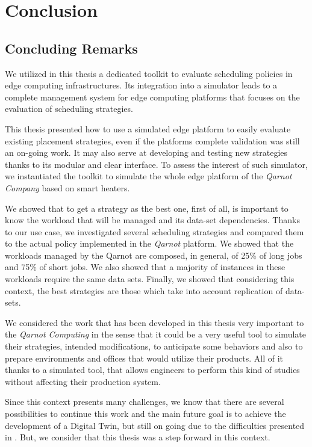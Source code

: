 \chapter{Conclusion}
\label{sec:conclusion}

\section{Concluding Remarks}

We utilized in this thesis a dedicated toolkit to evaluate scheduling policies in edge computing infrastructures. 
Its integration into a simulator leads to a complete management system for edge computing platforms that focuses on the evaluation of scheduling strategies.

This thesis presented how to use a simulated edge platform to easily evaluate existing placement strategies, even if the platforms complete validation was still an on-going work.
It may also serve at developing and testing new strategies thanks to its modular and clear interface.
%
To assess the interest of such simulator, we instantiated the toolkit to simulate the whole edge platform of the \emph{Qarnot Company} based on smart heaters.

We showed that to get a strategy as the best one, first of all, is important to know the workload that will be managed and its data-set dependencies.
Thanks to our use case, we investigated several scheduling strategies and compared them to the actual policy implemented in the \emph{Qarnot} platform. We showed that the workloads managed by the Qarnot are composed, in general, of 25\% of long jobs and 75\% of short jobs. We also showed that a majority of instances in these workloads require the same data sets.
Finally, we showed that considering this context, the best strategies are those which take into account replication of data-sets.

We considered the work that has been developed in this thesis very important to the \textit{Qarnot Computing} in the sense that it could be a very useful tool to simulate their strategies, intended modifications, to anticipate some behaviors and also to prepare environments and offices that would utilize their products. All of it thanks to a simulated tool, that allows engineers to perform this kind of studies without affecting their production system.

Since this context presents many challenges, we know that there are several possibilities to continue this work and the main future goal is to achieve the development of a Digital Twin, but still on going due to the difficulties presented in . But, we consider that this thesis was a step forward in this context.

